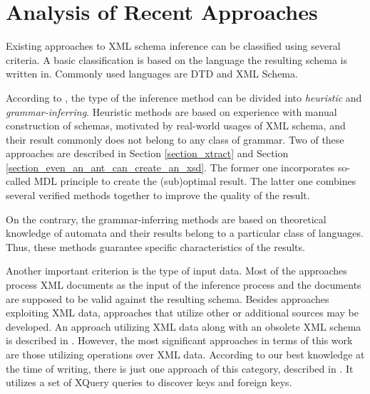 \chapter{Analysis of Recent Approaches} \label{chapter_analysis_of_recent_approaches}
Existing approaches to XML schema inference can be classified using several criteria. A basic classification is based on the language the resulting schema is written in. Commonly used languages are DTD and XML Schema.

According to \cite{Mlynkova:2008:AAX:1494650.1495496}, the type of the inference method can be divided into \emph{heuristic} and \emph{grammar-inferring}. Heuristic methods \cite{Chidlovskii:2002:SEX:544220.544288, Garofalakis:2000:XSE:342009.335409, Moh:2000:RSW:336597.336638, Wong03onstructural, Vosta:2008:EAC:1802514.1802522} are based on experience with manual construction of schemas, motivated by real-world usages of XML schema, and their result commonly does not belong to any class of grammar. Two of these approaches are described in Section \ref{section_xtract} and Section \ref{section_even_an_ant_can_create_an_xsd}. The former one incorporates so-called MDL principle to create the (sub)optimal result. The latter one combines several verified methods together to improve the quality of the result.

On the contrary, the grammar-inferring methods \cite{Ahonen1996GeneratingGrammars, Bex:2006:ICD:1182635.1164139, Bex:2007:IXS:1325851.1325964, Hegewald:2006:XES:1129755.1130124, Min:2003:EES:639473.639475, Fernau:2001:LXG:645744.667236} are based on theoretical knowledge of automata and their results belong to a particular class of languages. Thus, these methods guarantee specific characteristics of the results.

Another important criterion is the type of input data. Most of the approaches process XML documents as the input of the inference process and the documents are supposed to be valid against the resulting schema. Besides approaches exploiting XML data, approaches that utilize other or additional sources may be developed. An approach utilizing XML data along with an obsolete XML schema is described in \cite{Mlynkova:2009:IXS:1862681.1862693}. However, the most significant approaches in terms of this work are those utilizing operations over XML data. According to our best knowledge at the time of writing, there is just one approach of this category, described in \cite{Necasky:2009:DXK:1529282.1529414}. It utilizes a set of XQuery queries to discover keys and foreign keys.

